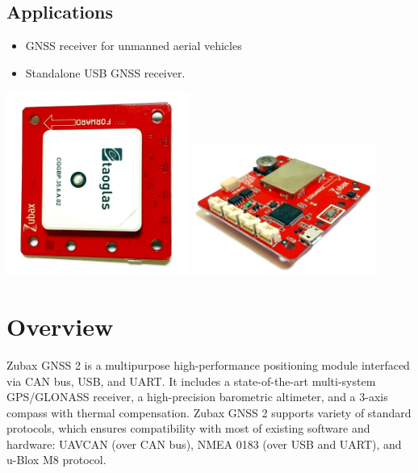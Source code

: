 \documentclass{zubaxdoc}
\begin{document}
\begin{titlepage}
\BeginRightColumn
\section*{Applications}

\begin{itemize}
	\item GNSS receiver for unmanned aerial vehicles
    \item Standalone USB GNSS receiver.
\end{itemize}

\centering
\includegraphics[width=0.45\textwidth]{GNSS_top}
\includegraphics[width=0.45\textwidth]{GNSS_bottom}

\end{titlepage}

\tableofcontents
\BeginRightColumn
\listoffigures
\listoftables

\mainmatter

\chapter{Overview}

Zubax GNSS 2 is a multipurpose high-performance positioning module interfaced via CAN bus, USB, and UART. It includes a state-of-the-art multi-system GPS/GLONASS receiver, a high-precision barometric altimeter, and a 3-axis compass with thermal compensation. Zubax GNSS 2 supports variety of standard protocols, which ensures compatibility with most of existing software and hardware: UAVCAN (over CAN bus), NMEA 0183 (over USB and UART), and u-Blox M8 protocol.
\end{document}
